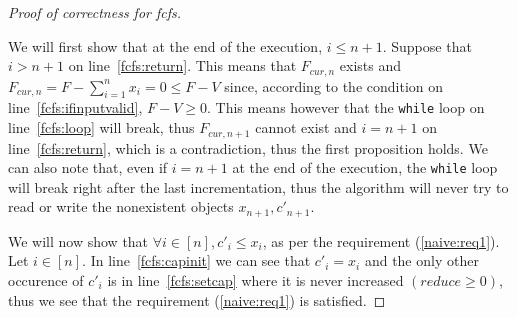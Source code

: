 \begin{proof}[Proof of correctness for fcfs] \

   We will first show that at the end of the execution, $i \leq n+1$. Suppose that $i > n+1$ on line~\ref{fcfs:return}. This
   means that $F_{cur,n}$ exists and $F_{cur,n} = F - \sum\limits_{i=1}^{n}x_i = 0 \leq F - V$ since, according to the
   condition on line~\ref{fcfs:ifinputvalid}, $F - V \geq 0$. This means however that the \texttt{while} loop on
   line~\ref{fcfs:loop} will break, thus $F_{cur,n+1}$ cannot exist and $i = n + 1$ on line~\ref{fcfs:return}, which is a
   contradiction, thus the first proposition holds. We can also note that, even if $i = n + 1$ at the end of the execution,
   the \texttt{while} loop will break right after the last incrementation, thus the algorithm will never try to read or
   write the nonexistent objects $x_{n+1}, c'_{n+1}$.

   We will now show that $\forall i \in [n], c'_i \leq x_i$, as per the requirement (\ref{naive:req1}). Let $i \in [n]$.
   In line~\ref{fcfs:capinit} we can see that $c'_i = x_i$ and the only other occurence of $c'_i$ is in
   line~\ref{fcfs:setcap} where it is never increased $\left(reduce \geq 0\right)$, thus we see that the requirement
   (\ref{naive:req1}) is satisfied.


\end{proof}
